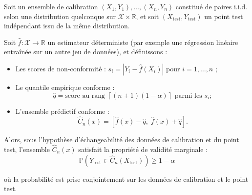 \documentclass[a4paper,12pt]{article}%
\begin{document}
\begin{theorem}
    Soit un ensemble de calibration $(X_1, Y_1), \dots, (X_n, Y_n)$ constitué de paires i.i.d. selon une distribution quelconque sur $\mathcal{X} \times \mathbb{R}$, et soit $(X_{\text{test}}, Y_{\text{test}})$ un point test indépendant issu de la même distribution.
    
    Soit $\hat{f} : \mathcal{X} \to \mathbb{R}$ un estimateur déterministe (par exemple une régression linéaire entraînée sur un autre jeu de données), et définissons :
    \begin{itemize}
        \item Les scores de non-conformité : $s_i = |Y_i - \hat{f}(X_i)|$ pour $i = 1, \dots, n$ ;
        \item Le quantile empirique conforme :
        \[
        \hat{q} = \text{score au rang } \left\lceil (n+1)(1 - \alpha) \right\rceil \text{ parmi les } s_i ;
        \]
        \item L'ensemble prédictif conforme :
        \[
        \hat{C}_n(x) = \left[ \hat{f}(x) - \hat{q},\; \hat{f}(x) + \hat{q} \right] .
        \]
    \end{itemize}
    
    Alors, sous l'hypothèse d'échangeabilité des données de calibration et du point test, l'ensemble $\hat{C}_n(x)$ satisfait la propriété de validité marginale :
    \[
    \mathbb{P}\left( Y_{\text{test}} \in \hat{C}_n(X_{\text{test}}) \right) \geq 1 - \alpha
    \]
    
    où la probabilité est prise conjointement sur les données de calibration et le point test.
    \end{theorem}
\end{document}
